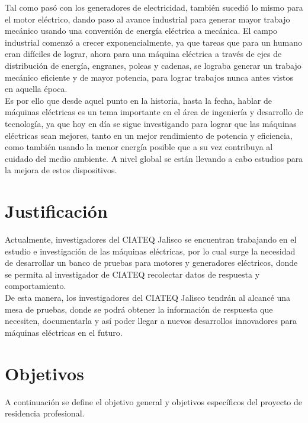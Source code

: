 \documentclass[12pt,titlepage]{article}
\begin{document}
Tal como pasó con los generadores de electricidad, también sucedió lo mismo para el motor eléctrico, dando paso al avance industrial para generar mayor trabajo mecánico usando una conversión de energía eléctrica a mecánica. El campo industrial comenzó a crecer exponencialmente, ya que tareas que para un humano eran difíciles de lograr, ahora para una máquina eléctrica a través de ejes de distribución de energía, engranes, poleas y cadenas, se lograba generar un trabajo mecánico eficiente y de mayor potencia, para lograr trabajos nunca antes vistos en aquella época. \\[0.15mm]

Es por ello que desde aquel punto en la historia, hasta la fecha, hablar de máquinas eléctricas es un tema importante en el área de ingeniería y desarrollo de tecnología, ya que hoy en día se sigue investigando para lograr que las máquinas eléctricas sean mejores, tanto en un mejor rendimiento de potencia y eficiencia, como también usando la menor energía posible que a su vez contribuya al cuidado del medio ambiente.  A nivel global se están llevando a cabo estudios para la mejora de estos dispositivos. \\[0.3mm]


\newpage
\section{Justificación}

Actualmente, investigadores del CIATEQ Jalisco  se encuentran trabajando en el estudio e investigación de las máquinas eléctricas, por lo cual surge la necesidad de desarrollar un banco de pruebas para motores y generadores eléctricos, donde se permita al investigador de CIATEQ recolectar datos de respuesta y comportamiento.\\

De esta manera, los investigadores del CIATEQ Jalisco tendrán al alcancé una mesa de pruebas, donde se podrá obtener la información de respuesta que necesiten, documentarla y así poder llegar  a nuevos desarrollos innovadores para máquinas eléctricas en el futuro. \\

\newpage 
\section{Objetivos}
A continuación se define el objetivo general y objetivos específicos del proyecto de residencia profesional. 
\end{document}
